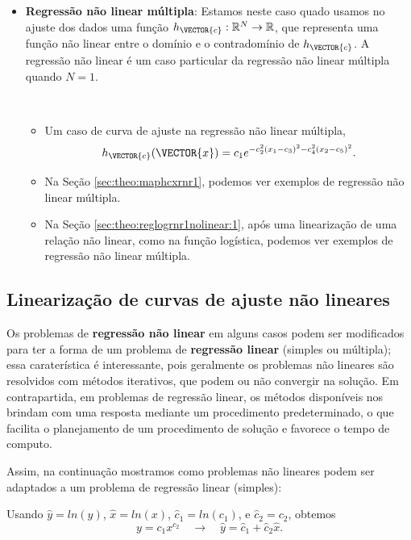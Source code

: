 \begin{itemize}
\item \textbf{Regressão não linear múltipla}: 
Estamos neste caso quado usamos no ajuste dos dados
uma função $h_{\VECTOR{c}}:\mathbb{R}^{N} \rightarrow \mathbb{R}$, 
que representa uma função não linear entre o domínio e o contradomínio de $h_{\VECTOR{c}}$.
A regressão não linear é um caso particular da regressão não linear múltipla quando $N=1$.
\begin{example}~
\begin{itemize}
\item Um caso de curva de ajuste na regressão não linear múltipla, 
\begin{equation}
h_{\VECTOR{c}}(\VECTOR{x})=c_1 e^{- c_2^2(x_1 -c_3)^2- c_4^2(x_2 -c_5)^2}.
\end{equation}
\item Na Seção \ref{sec:theo:maphcxrnr1}, podemos ver exemplos de regressão não linear múltipla.
\item Na Seção \ref{sec:theo:reglogrnr1nolinear:1}, após uma linearização de uma relação não linear,
como na função logística, podemos ver exemplos de regressão não linear múltipla.
\end{itemize}
\end{example}
\end{itemize}

\subsection{Linearização de curvas de ajuste não lineares}

Os problemas de \textbf{regressão não linear}
em alguns casos podem ser modificados para ter a forma de um 
problema de \textbf{regressão linear} (simples ou múltipla);
essa caraterística é interessante, pois geralmente
os problemas não lineares são resolvidos com métodos iterativos,
que podem ou não convergir na solução.
Em contrapartida, em problemas de regressão linear,
os métodos disponíveis nos brindam com uma resposta mediante um procedimento 
predeterminado, 
o que facilita o planejamento de um procedimento de solução e favorece o tempo de computo.

Assim, na continuação mostramos 
como problemas não lineares podem ser 
adaptados a um problema de regressão linear (simples):
\begin{example}
Usando 
$\hat{y}=ln(y)$,  
$\hat{x}=ln(x)$, 
$\hat{c}_1=ln(c_1)$, e
$\hat{c}_2=c_2$, obtemos %
\begin{equation}
y=c_1x^{c_2}
\quad \rightarrow \quad 
\hat{y}=\hat{c}_1+\hat{c}_2 \hat{x}.
\end{equation}
\vspace{-2pt}
\end{example}

